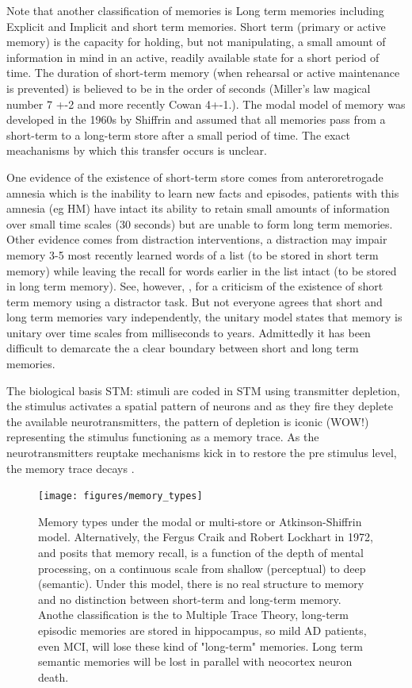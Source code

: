 \documentclass[11pt]{article}
\theoremstyle{definition}
\theoremstyle{remark}
\begin{document}
Note that another classification of memories is Long term memories including Explicit and Implicit and short term memories. Short term (primary or active memory) is the capacity for holding, but not manipulating, a small amount of information in mind in an active, readily available state for a short period of time.  The duration of short-term memory (when rehearsal or active maintenance is prevented) is believed to be in the order of seconds (Miller's law magical number 7 +-2 and more recently Cowan 4+-1.).
The modal model of memory was developed in the 1960s by Shiffrin and assumed that all memories pass from a short-term to a long-term store after a small period of time. The exact meachanisms by which this transfer occurs is unclear.

One evidence of the existence of short-term store comes from anteroretrogade amnesia which is the inability to learn new facts and episodes, patients with this amnesia (eg HM) have intact its ability to retain small amounts of information over small time scales (30 seconds) but are unable to form long term memories. Other evidence comes from distraction interventions, a distraction may impair memory 3-5 most recently learned words of a list (to be stored in short  term memory) while leaving the recall for words earlier in the list intact (to be stored in long term memory). See, however, \cite{bjork1974recency}, for a criticism of the existence of short term memory using a distractor task. But not everyone agrees that short and long term memories vary independently, the unitary model states that memory is unitary over time scales from milliseconds to years. Admittedly it has been difficult to demarcate the a clear boundary between short and long term memories.

The biological basis STM: stimuli are coded in STM using transmitter depletion, the stimulus activates a spatial pattern of neurons and as they fire they deplete the available neurotransmitters, the pattern of depletion is iconic (WOW!) representing the stimulus functioning as a memory trace. As the neurotransmitters reuptake mechanisms kick in to restore the pre stimulus level, the memory trace decays \cite{grossberg1971pavlovian}.

\begin{figure}[H]
        \centering
        \texttt{[image: figures/memory\_types]}
        \caption{Memory types under the modal or multi-store or Atkinson-Shiffrin model. Alternatively, the Fergus Craik and Robert Lockhart in 1972, and posits that memory recall, is a function of the depth of mental processing, on a continuous scale from shallow (perceptual) to deep (semantic). Under this model, there is no real structure to memory and no distinction between short-term and long-term memory. Anothe classification is the to Multiple Trace Theory, long-term episodic memories are stored in hippocampus, so mild AD patients, even MCI, will lose these kind of "long-term" memories. Long term semantic memories will be lost in parallel with neocortex neuron death.
        } 
        \label{fig:b}
\end{figure}
\end{document}

